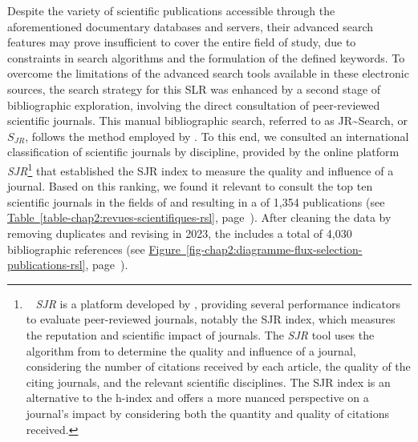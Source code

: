 \begin{refsegment}
Despite the variety of scientific publications accessible through the aforementioned documentary databases and servers, their advanced search features may prove insufficient to cover the entire field of study, due to constraints in search algorithms and the formulation of the defined keywords. To overcome the limitations of the advanced search tools available in these electronic sources, the search strategy for this \acrshort{SLR} was enhanced by a second stage of bibliographic exploration, involving the direct consultation of peer-reviewed scientific journals. This manual bibliographic search, referred to as \acrfull{JR~Search}, or \(S_{JR}\), follows the method employed by \textcolor{blue}{\textcite[738]{padeiro_transit-oriented_2019}}. To this end, we consulted an international classification of scientific journals by discipline, provided by the online platform \textsl{SJR}\footnote{~
    \textsl{SJR} is a platform developed by , providing several performance indicators to evaluate peer-reviewed journals, notably the \acrfull{SJR} index, which measures the reputation and scientific impact of journals. The \textsl{SJR} tool uses the  algorithm from  to determine the quality and influence of a journal, considering the number of citations received by each article, the quality of the citing journals, and the relevant scientific disciplines. The \acrshort{SJR} index is an alternative to the \acrfull{h-index} and offers a more nuanced perspective on a journal's impact by considering both the quantity and quality of citations received.
} that established the \acrfull{SJR} index to measure the quality and influence of a journal. Based on this ranking, we found it relevant to consult the top ten scientific journals in the fields of  and  resulting in a  of 1,354 publications (see \hyperref[table-chap2:revues-scientifiques-rsl]{Table~\ref{table-chap2:revues-scientifiques-rsl}}, page~\pageref{table-chap2:revues-scientifiques-rsl}). After cleaning the data by removing duplicates and revising in 2023, the  includes a total of 4,030 bibliographic references (see \hyperref[fig-chap2:diagramme-flux-selection-publications-rsl]{Figure~\ref{fig-chap2:diagramme-flux-selection-publications-rsl}}, page~\pageref{fig-chap2:diagramme-flux-selection-publications-rsl}).%


\end{refsegment}
